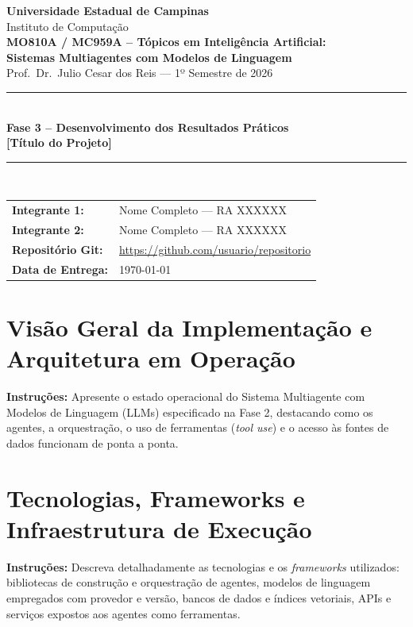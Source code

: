\documentclass[12pt,a4paper]{article}
\newcommand{\dica}[1]{%
  \begin{instrucao}
  \small\textcolor{gray!80!black}{\textbf{Instruções:} #1}
  \end{instrucao}
}
\begin{document}
\begin{center}
  {\LARGE \textbf{Universidade Estadual de Campinas}}\\[0.2cm]
  {\large Instituto de Computação}\\[0.5cm]
  {\large \textbf{MO810A / MC959A -- Tópicos em Inteligência Artificial:}}\\[0.1cm]
  {\large \textbf{Sistemas Multiagentes com Modelos de Linguagem}}\\[0.2cm]
  {\normalsize Prof.\ Dr.\ Julio Cesar dos Reis --- 1º Semestre de 2026}\\[0.6cm]
  \rule{\textwidth}{0.4pt}\\[0.4cm]
  {\Large \textbf{Fase 3 -- Desenvolvimento dos Resultados Práticos}}\\[0.3cm]
  {\large \textbf{[Título do Projeto]}}\\[0.3cm]
  \rule{\textwidth}{0.4pt}\\[0.4cm]
\end{center}

\noindent
\begin{tabular}{@{}ll@{}}
  \textbf{Integrante 1:} & Nome Completo --- RA XXXXXX \\
  \textbf{Integrante 2:} & Nome Completo --- RA XXXXXX \\
  \textbf{Repositório Git:} & \url{https://github.com/usuario/repositorio} \\
  \textbf{Data de Entrega:} & \today \\
\end{tabular}

\vspace{0.6cm}

\section{Visão Geral da Implementação e Arquitetura em Operação}
\label{sec:visao-geral}
\dica{Apresente o estado operacional do Sistema Multiagente com Modelos de Linguagem (LLMs) especificado na Fase 2, destacando como os agentes, a orquestração, o uso de ferramentas (\textit{tool use}) e o acesso às fontes de dados funcionam de ponta a ponta.}

\section{Tecnologias, Frameworks e Infraestrutura de Execução}
\label{sec:tecnologias}
\dica{Descreva detalhadamente as tecnologias e os \textit{frameworks} utilizados: bibliotecas de construção e orquestração de agentes, modelos de linguagem empregados com provedor e versão, bancos de dados e índices vetoriais, APIs e serviços expostos aos agentes como ferramentas.}
\end{document}
